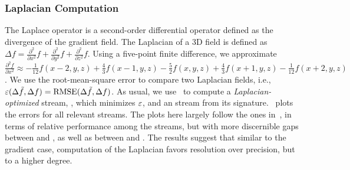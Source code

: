 \subsubsection{Laplacian Computation}\label{sec:laplacian}

The Laplace operator is a second-order differential operator defined as the divergence of the
gradient field. The Laplacian of a 3D field is defined as $\Delta f = 
\frac{{\partial}^2}{\partial{x^2}}f+\frac{{\partial}^2}{\partial{y^2}}f+\frac{{\partial}^2}{\partial{z^2}}f$.
%
Using a five-point finite difference, we approximate 
$\frac{{\partial}^2 f}{\partial{x^2}}
\approx
-\frac{1}{12}f(x-2,y,z)+\frac{4}{3}f(x-1,y,z)-\frac{5}{2}f(x,y,z)+\frac{4}{3}f(x+1,y,z)-\frac{1}{12}f(x+2,y,z)$.
We use the root-mean-square error to compare two Laplacian fields, i.e., $\err(\Delta
\tilde{f},\Delta f)=\text{RMSE}(\Delta \tilde{f},\Delta f)$. As usual, we use~ to
compute a \emph{Laplacian-optimized} stream, \slop, which minimizes $\err$, and an \slsg stream from
its signature.~ plots the errors for all relevant streams. The
plots here largely follow the ones in~, in terms of relative
performance among the streams, but with more discernible gaps between \sbit and \slsg, as well as
between \slsg and \sbit. The results suggest that similar to the gradient case, computation of the
Laplacian favors resolution over precision, but to a higher degree.